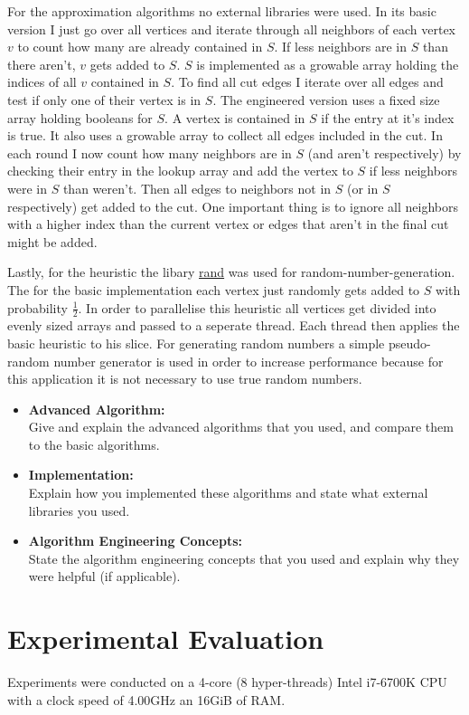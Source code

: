 \documentclass[twocolumn]{article}
\begin{document}
For the approximation algorithms no external libraries were used. 
In its basic version I just go over all vertices and iterate through all neighbors of each vertex $v$ to count how many are already contained in $S$.
If less neighbors are in $S$ than there aren't, $v$ gets added to $S$. $S$ is implemented as a growable array holding the indices of all $v$ contained in $S$.
To find all cut edges I iterate over all edges and test if only one of their vertex is in $S$.
The engineered version uses a fixed size array holding booleans for $S$. A vertex is contained in $S$ if the entry at it's index is true.
It also uses a growable array to collect all edges included in the cut. In each round I now count how many neighbors are in $S$ (and aren't respectively) by checking their entry in
the lookup array and add the vertex to $S$ if less neighbors were in $S$ than weren't. Then all edges to neighbors not in $S$ (or in $S$ respectively) get added to the cut.
One important thing is to ignore all neighbors with a higher index than the current vertex or edges that aren't in the final cut might be added.

Lastly, for the heuristic the libary \href{https://crates.io/crates/rand}{rand} was used for random-number-generation.
The for the basic implementation each vertex just randomly gets added to $S$ with probability $\frac{1}{2}$.
In order to parallelise this heuristic all vertices get divided into evenly sized arrays and passed to a seperate thread.
Each thread then applies the basic heuristic to his slice. For generating random numbers a simple pseudo-random number generator is used
in order to increase performance because for this application it is not necessary to use true random numbers.

\begin{itemize}
	\item \textbf{Advanced Algorithm:}\\
		Give and explain the advanced algorithms that you used, and compare them to the basic algorithms.
	\item \textbf{Implementation:}\\
		Explain how you implemented these algorithms and state what external libraries you used.
	\item \textbf{Algorithm Engineering Concepts:}\\
		State the algorithm engineering concepts that you used and explain why they were helpful (if applicable).
\end{itemize}

\section{Experimental Evaluation}
Experiments were conducted on a 4-core (8 hyper-threads) Intel i7-6700K CPU with a clock speed
of 4.00GHz an 16GiB of RAM.
\end{document}
